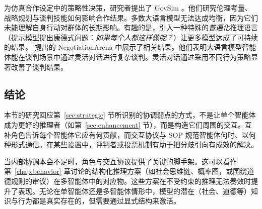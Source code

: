 为仿真合作设定中的策略性决策，研究者提出了 GovSim \citep{piatti2024cooperate}。他们研究伦理考量、战略规划与谈判技能如何影响合作结果。多数大语言模型无法达成均衡，因为它们未能理解自身行动对群体的长期影响。有趣的是，引入一种特殊的\emph{普遍化}推理语言 \citep{levine2020logic}（提示模型提出康德式问题：\emph{如果每个人都这样做呢？}）让更多模型达成了可持续的结果。\citet{bianchi2024well} 提出的 NegotiationArena 中展示了相关结果。他们表明大语言模型智能体能在谈判场景中通过灵活对话进行复杂谈判。灵活对话通过采用不同行为策略显著改善了谈判结果。

\subsection{结论}
本节的研究回应第~\ref{sec:strategic} 节所识别的协调弱点的方式，不是让单个智能体成为更好的推理者（如第~\ref{sec:enhancement} 节），而是构造它们周围的交互。互补角色告诉每个智能体它应有何贡献，而交互协议与 SOP 规范智能体何时、以何种形式通信。在某些设置中，评判者或投票机制有助于把分歧引向有成效的解决。

当内部协调本会不足时，角色与交互协议提供了关键的脚手架。这可以看作第~\ref{chap:behavior} 章讨论的结构化推理方案（如社会思维链、概率图，或围绕道德规则的审议）在多智能体中的对应物。这些方案在不受约束的推理无法奏效时提升了表现。无论在单智能体还是多智能体情形中，模型的潜在（社会、道德等）知识与行为都是真实存在的，但需要通过显式结构来激活。



